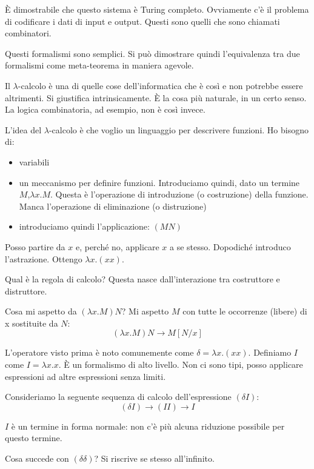 È dimostrabile che questo sistema è Turing completo. Ovviamente c'è il problema di codificare i
dati di input e output. Questi sono quelli che sono chiamati combinatori.

Questi formalismi sono semplici. Si può dimostrare quindi l'equivalenza tra due formalismi come
meta-teorema in maniera agevole.

Il $\lambda$-calcolo è una di quelle cose dell'informatica che è così e non potrebbe essere
altrimenti. Si giustifica intrinsicamente. È la cosa più naturale, in un certo senso. La logica
combinatoria, ad esempio, non è così invece.

L'idea del $\lambda$-calcolo è che voglio un linguaggio per descrivere funzioni. Ho bisogno di:
\begin{itemize}
    \item variabili
    \item un meccanismo per definire funzioni. Introduciamo quindi, dato un termine $M$,$\lambda
    x. M$. Questa è l'operazione di introduzione (o costruzione) della funzione. Manca l'operazione di
    eliminazione (o distruzione)
    \item introduciamo quindi l'applicazione: $(M N)$
\end{itemize}
Posso partire da $x$ e, perché no, applicare $x$ a se stesso. Dopodiché introduco l'astrazione.
Ottengo $\lambda x. (x x)$.

Qual è la regola di calcolo? Questa nasce dall'interazione tra costruttore e distruttore.

Cosa mi aspetto da $(\lambda x. M) N$? Mi aspetto $M$ con tutte le occorrenze (libere) di x sostituite
da $N$:
\begin{equation*}
    (\lambda x. M) N \to M[N/x]
\end{equation*}

L'operatore visto prima è noto comunemente come $\delta = \lambda x. (x x)$. Definiamo $I$ come $I =
\lambda x. x$. È un formalismo di alto livello. Non ci sono tipi, posso applicare espressioni ad
altre espressioni senza limiti.

Consideriamo la seguente sequenza di calcolo dell'espressione $(\delta I)$:
\begin{equation*}
    (\delta I) \to (I I) \to I
\end{equation*}

$I$ è un termine in forma normale: non c'è più alcuna riduzione possibile per questo termine.

Cosa succede con $(\delta \delta)$? Si riscrive se stesso all'infinito.

